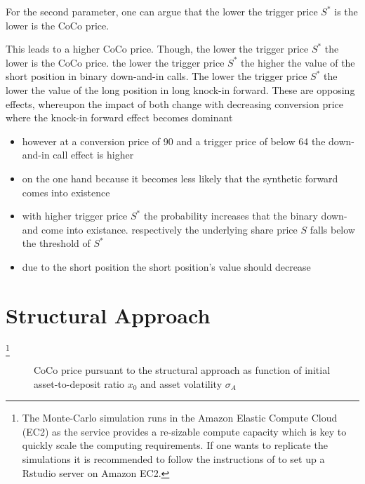 For the second parameter, one can argue that the lower the trigger price $S^*$ is the lower is the CoCo price.  


This leads to a higher CoCo price. Though, the lower the trigger price $S^*$ the lower is the CoCo price. the lower the trigger price $S^*$ the higher the value of the short position in binary down-and-in calls. The lower the trigger price $S^*$ the lower the value of the long position in long knock-in forward. These are opposing effects, whereupon the impact of both change with decreasing conversion price where the knock-in forward effect becomes dominant
 
 \begin{itemize}
  \item however at a conversion price of 90 and a trigger price of below 64 the down-and-in call effect is higher
  \item on the one hand because it becomes less likely that the synthetic forward comes into existence 
  \item with higher trigger price $S^*$ the probability increases that the binary down-and come into existance. respectively the underlying share price $S$ falls below the threshold of $S^*$
  \item due to the short position the short position's value should decrease
  \end{itemize}

\section{Structural Approach}\label{sensistructural}

\footnote{The Monte-Carlo simulation runs in the Amazon Elastic Compute Cloud (EC2) as the service provides a re-sizable compute capacity which is key to quickly scale the computing requirements. If one wants to replicate the simulations it is recommended to follow the instructions of \citet{amazonrstudio} to set up a Rstudio server on Amazon EC2.}
\begin{figure}[H]
\centering
    \caption[CoCo price pursuant to the structural approach as function of asset-to-deposit ratio and asset volatility]{CoCo price pursuant to the structural approach as function of initial asset-to-deposit ratio $x_0$ and asset volatility $\sigma_A$}
  \label{fig:sa1}
  \end{figure}
  
